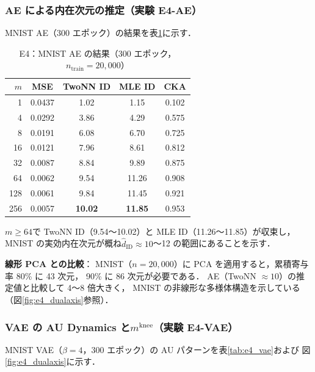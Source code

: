 \documentclass[11pt,a4paper]{jsarticle}
\newcommand{\mknee}{m^{\mathrm{knee}}}
\begin{document}
\subsubsection{AE による内在次元の推定（実験 E4-AE）}

MNIST AE（300 エポック）の結果を表\ref{tab:e4_ae}に示す．

\begin{table}[H]
\centering
\caption{E4：MNIST AE の結果（300 エポック，$n_{\mathrm{train}}=20{,}000$）}
\label{tab:e4_ae}
\small
\begin{tabular}{rcccc}
\toprule
$m$ & MSE & TwoNN ID & MLE ID & CKA \\
\midrule
1   & 0.0437 & 1.02  & 1.15  & 0.102 \\
4   & 0.0292 & 3.86  & 4.29  & 0.575 \\
8   & 0.0191 & 6.08  & 6.70  & 0.725 \\
16  & 0.0121 & 7.96  & 8.61  & 0.812 \\
32  & 0.0087 & 8.84  & 9.89  & 0.875 \\
64  & 0.0062 & 9.54  & 11.26 & 0.908 \\
128 & 0.0061 & 9.84  & 11.45 & 0.921 \\
256 & 0.0057 & \textbf{10.02} & \textbf{11.85} & 0.953 \\
\bottomrule
\end{tabular}
\end{table}

$m \geq 64$で TwoNN ID（9.54〜10.02）と MLE ID（11.26〜11.85）が収束し，
MNIST の実効内在次元が概ね$\hat{d}_\mathrm{ID} \approx 10$〜12 の範囲にあることを示す．

\textbf{線形 PCA との比較}：
MNIST（$n = 20{,}000$）に PCA を適用すると，累積寄与率 80\% に 43 次元，
90\% に 86 次元が必要である．
AE（TwoNN $\approx 10$）の推定値と比較して 4〜8 倍大きく，
MNIST の非線形な多様体構造を示している（図\ref{fig:e4_dualaxis}参照）．

\subsubsection{VAE の AU Dynamics と$\mknee$（実験 E4-VAE）}

MNIST VAE（$\beta = 4$，300 エポック）の AU パターンを表\ref{tab:e4_vae}および
図\ref{fig:e4_dualaxis}に示す．
\end{document}
